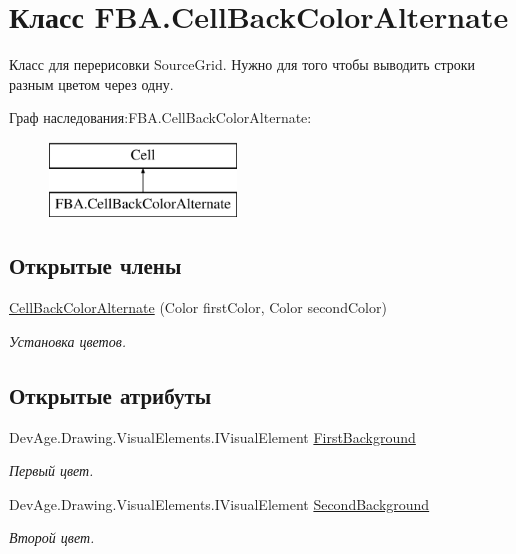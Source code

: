\hypertarget{class_f_b_a_1_1_cell_back_color_alternate}{}\section{Класс F\+B\+A.\+Cell\+Back\+Color\+Alternate}
\label{class_f_b_a_1_1_cell_back_color_alternate}


Класс для перерисовки Source\+Grid. Нужно для того чтобы выводить строки разным цветом через одну.  


Граф наследования\+:F\+B\+A.\+Cell\+Back\+Color\+Alternate\+:\begin{figure}[H]
\begin{center}
\leavevmode
\includegraphics[height=2.000000cm]{class_f_b_a_1_1_cell_back_color_alternate}
\end{center}
\end{figure}
\subsection*{Открытые члены}
\begin{DoxyCompactItemize}
\item 
\mbox{\hyperlink{class_f_b_a_1_1_cell_back_color_alternate_a7cae4adaac990284e5b97c306198e579}{Cell\+Back\+Color\+Alternate}} (Color first\+Color, Color second\+Color)
\begin{DoxyCompactList}\small\item\em Установка цветов. \end{DoxyCompactList}\end{DoxyCompactItemize}
\subsection*{Открытые атрибуты}
\begin{DoxyCompactItemize}
\item 
Dev\+Age.\+Drawing.\+Visual\+Elements.\+I\+Visual\+Element \mbox{\hyperlink{class_f_b_a_1_1_cell_back_color_alternate_a473698a7200e4a968dcbac7f8aa2f44b}{First\+Background}}
\begin{DoxyCompactList}\small\item\em Первый цвет. \end{DoxyCompactList}\item 
Dev\+Age.\+Drawing.\+Visual\+Elements.\+I\+Visual\+Element \mbox{\hyperlink{class_f_b_a_1_1_cell_back_color_alternate_a4b151754e326967c87b3a3bafe26df41}{Second\+Background}}
\begin{DoxyCompactList}\small\item\em Второй цвет. \end{DoxyCompactList}\end{DoxyCompactItemize}
